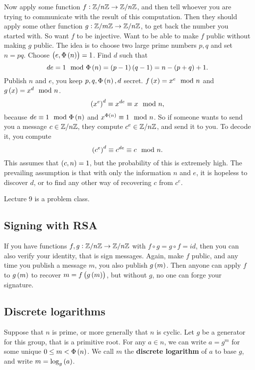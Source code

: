 Now apply some function $ f : \mathbb{Z} / n\mathbb{Z} \to \mathbb{Z} / n\mathbb{Z} $, and then tell whoever you are trying to communicate with the result of this computation. Then they should apply some other function $ g : \mathbb{Z} / m\mathbb{Z} \to \mathbb{Z} / n\mathbb{Z} $, to get back the number you started with. So want $ f $ to be injective. Want to be able to make $ f $ public without making $ g $ public. The idea is to choose two large prime numbers $ p, q $ and set $ n = pq $. Choose $ \br{e, \Phi\br{n}} = 1 $. Find $ d $ such that
$$ de = 1 \mod \Phi\br{n} = \br{p - 1}\br{q - 1} = n - \br{p + q} + 1. $$
Publish $ n $ and $ e $, you keep $ p, q, \Phi\br{n}, d $ secret. $ f\br{x} = x^e \mod n $ and $ g\br{x} = x^d \mod n $.
$$ \br{x^e}^d \equiv x^{de} \equiv x \mod n, $$
because $ de \equiv 1 \mod \Phi\br{n} $ and $ x^{\Phi\br{n}} \equiv 1 \mod n $. So if someone wants to send you a message $ c \in \mathbb{Z} / n\mathbb{Z} $, they compute $ c^e \in \mathbb{Z} / n\mathbb{Z} $, and send it to you. To decode it, you compute
$$ \br{c^e}^d \equiv c^{de} \equiv c \mod n. $$
This assumes that $ \br{c, n} = 1 $, but the probability of this is extremely high. The prevailing assumption is that with only the information $ n $ and $ e $, it is hopeless to discover $ d $, or to find any other way of recovering $ c $ from $ c^e $.


Lecture 9 is a problem class.


\subsection{Signing with RSA}

If you have functions $ f, g : \mathbb{Z} / n\mathbb{Z} \to \mathbb{Z} / n\mathbb{Z} $ with $ f \circ g = g \circ f = id $, then you can also verify your identity, that is sign messages. Again, make $ f $ public, and any time you publish a message $ m $, you also publish $ g\br{m} $. Then anyone can apply $ f $ to $ g\br{m} $ to recover $ m = f\br{g\br{m}} $, but without $ g $, no one can forge your signature.

\subsection{Discrete logarithms}

Suppose that $ n $ is prime, or more generally that $ \unit{n} $ is cyclic. Let $ g $ be a generator for this group, that is a primitive root. For any $ a \in \unit{n} $, we can write $ a = g^m $ for some unique $ 0 \le m < \Phi\br{n} $. We call $ m $ the \textbf{discrete logarithm} of $ a $ to base $ g $, and write $ m = \log_g\br{a} $.

